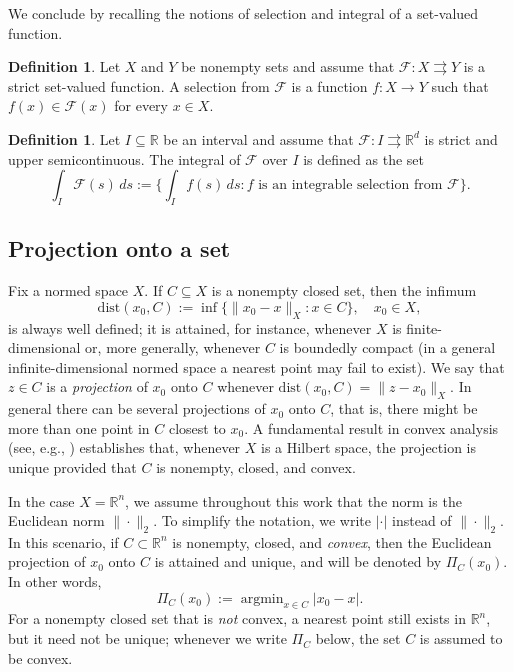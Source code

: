 \documentclass[11pt]{elsarticle}
\theoremstyle{definition}
\newtheorem{definition}[theorem]{Definition}
\theoremstyle{remark}
\numberwithin{equation}{section}
\DeclareMathOperator{\argmin}{argmin}
\begin{document}
	
	
	We conclude by recalling the notions of selection and integral of a set-valued function.
	
	\begin{definition}
		Let $X$ and $Y$ be nonempty sets and
		assume that $\mathcal{F}:X\rightrightarrows Y$ is a strict set-valued function.
		A selection from $\mathcal{F}$ is a function $f:X \to Y$
		such that $f(x)\in\mathcal{F}(x)$ for every $x\in X$.
	\end{definition}
	
	\begin{definition}
		Let $I\subseteq\mathbb{R}$ be an interval and
		assume that  $\mathcal{F}:I\rightrightarrows \mathbb{R}^d$ is strict and upper semicontinuous. The integral of $\mathcal{F}$ over $I$ is defined as the set
		\[
		\int_I \mathcal{F}(s) \, ds := \Big\{ \int_I f(s)\,ds : f \text{ is an integrable selection from } \mathcal{F} \Big\}.
		\]
	\end{definition}
	
	
	
	\subsection{Projection onto a set} \label{sec:projection}
	
	Fix a normed space $X$.
	If $C \subseteq X$ is a nonempty closed set, then the infimum
	\begin{equation*}
		\text{dist}(x_0,C) := \inf\{\|x_0 - x\|_X : x \in C\}, \quad x_0 \in X,
	\end{equation*}
	is always well defined; it is attained, for instance, whenever $X$ is finite-dimensional or, more generally, whenever $C$ is boundedly compact (in a general infinite-dimensional normed space a nearest point may fail to exist). We say that $z\in C$ is a \textit{projection} of $x_0$ onto $C$ whenever $\text{dist}(x_0,C)=\|z - x_0\|_X$. In general there can be several projections of $x_0$ onto $C$, that is, there might be more than one point in $C$ closest to $x_0$.
	A fundamental result in convex analysis (see, e.g., \cite[Theorem~5.2, p.\,132]{brezis_2011}) establishes that, whenever $X$ is a Hilbert space, the projection is unique provided that $C$ is nonempty, closed, and convex.
	
	In the case $X=\mathbb{R}^n$, we assume throughout this work that the norm is the Euclidean norm $\|\cdot\|_2$. To simplify the notation, we write $|\cdot|$ instead of $\|\cdot\|_2$. In this scenario, if $C\subset\mathbb{R}^n$ is nonempty, closed, and \emph{convex}, then the Euclidean projection of $x_0$ onto $C$ is attained and unique, and will be denoted by $\Pi_C(x_0)$. In other words,
	\begin{equation}
		\Pi_{C}(x_0):=\argmin_{x\in C}|x_0-x|.
	\end{equation}
For a nonempty closed set that is \emph{not} convex, a nearest point still exists in $\mathbb{R}^n$, but it need not be unique; whenever we write $\Pi_C$ below, the set $C$ is assumed to be convex.
	
\end{document}
